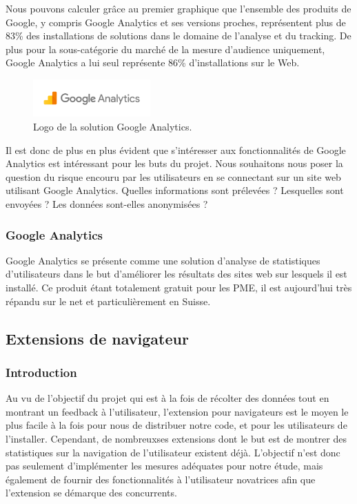 			Nous pouvons calculer grâce au premier graphique que l'ensemble des produits de Google, y compris Google Analytics et ses versions proches, représentent plus de 83\% des installations de solutions dans le domaine de l'analyse et du tracking. De plus pour la sous-catégorie du marché de la mesure d'audience uniquement, Google Analytics a lui seul représente 86\% d'installations sur le Web.

			\begin{figure}[ht]
				\centering
				\includegraphics[width=0.4\textwidth]{images/analysis/analytics}
				\caption{Logo de la solution Google Analytics\cite{analytics}.}
				\label{a-analytics}
			\end{figure}

			Il est donc de plus en plus évident que s'intéresser aux fonctionnalités de Google Analytics est intéressant pour les buts du projet. Nous souhaitons nous poser la question du risque encouru par les utilisateurs en se connectant sur un site web utilisant Google Analytics. Quelles informations sont prélevées ? Lesquelles sont envoyées ? Les données sont-elles anonymisées ?

		\subsubsection{Google Analytics}

			Google Analytics se présente comme une solution d'analyse de statistiques d'utilisateurs dans le but d'améliorer les résultats des sites web sur lesquels il est installé. Ce produit étant totalement gratuit pour les PME, il est aujourd'hui très répandu sur le net et particulièrement en Suisse\cite{analytics-usage}.

	\subsection{Extensions de navigateur}

		\subsubsection{Introduction}

			Au vu de l'objectif du projet qui est à la fois de récolter des données tout en montrant un feedback à l'utilisateur, l'extension pour navigateurs est le moyen le plus facile à la fois pour nous de distribuer notre code, et pour les utilisateurs de l'installer. Cependant, de nombreuxses extensions dont le but est de montrer des statistiques sur la navigation de l'utilisateur existent déjà. L'objectif n'est donc pas seulement d'implémenter les mesures adéquates pour notre étude, mais également de fournir des fonctionnalités à l'utilisateur novatrices afin que l'extension se démarque des concurrents.

